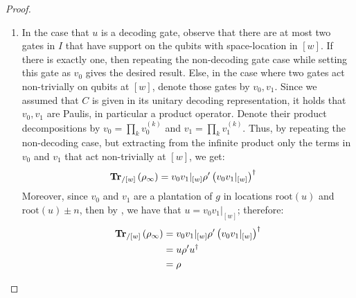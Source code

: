 \begin{proof}
\begin{enumerate}
\begin{enumerate}
 \begin{equation*}
   \begin{split}
   \Trr{}_{/[w]}\left( \rho_{\infty} \right) &= \Trr{}_{/[w]}\left( \prod_{j = -\infty}^{\infty} v_{j} \rho_{\infty}^{\prime} \prod_{j = -\infty}^{\infty} v_{j}^{\dagger} \right) \\ 
   &= v_{0}\Trr{}_{/[w]}\left( \prod_{j = -\infty, j \neq 0}^{\infty} v_{j} \rho_{\infty}^{\prime} \prod_{j = -\infty, j \neq 0}^{\infty} v_{j}^{\dagger} \right) v_{0}^{\dagger} \\
   &= v_{0}\Trr{}_{/[w]}\left( \prod_{j = -\infty, j \neq 0}^{\infty} v_{j}^{\dagger} \prod_{j = -\infty, j \neq 0}^{\infty} v_{j} \rho_{\infty}^{\prime} \right) v_{0}^{\dagger} \\
   &= v_{0}\Trr{}_{/[w]}\left( \rho_{\infty}^{\prime} \right) v_{0}^{\dagger} \\
   &= v_{0} \rho^{\prime} v_{0}^{\dagger} \\
   &= \rho 
   \end{split}
 \end{equation*}

 \item In the case that $u$ is a decoding gate, observe that there are at most two gates in $I$ that have support on the qubits with space-location in $[w]$. If there is exactly one, then repeating the non-decoding gate case while setting this gate as $v_{0}$ gives the desired result. 
Else, in the case where two gates act non-trivially on qubits at $[w]$, denote those gates by $v_{0}, v_{1}$. Since we assumed that $C$ is given in its unitary decoding representation, it holds that $v_{0}, v_{1}$ are Paulis, in particular a product operator. Denote their product decompositions by $v_{0} = \prod_{k}v_{0}^{(k)}$ and $v_{1} = \prod_{k}v_{1}^{(k)}$. Thus, by repeating the non-decoding case, but extracting from the infinite product only the terms in $v_{0}$ and $v_{1}$ that act non-trivially at $[w]$, we get:
   \begin{equation*}
     \begin{split}
       \mathbf{Tr}{}_{/[w]}\left( \rho_{\infty} \right) &= v_{0}v_{1}|_{[w]} \rho^{\prime} \left(v_{0}v_{1}|_{[w]}\right)^{\dagger} 
     \end{split}
   \end{equation*}
Moreover, since $v_{0}$ and $v_{1}$ are a plantation of $g$ in locations $\text{root}(u)$ and $\text{root}(u) \pm n$, then by , we have that $u = v_{0}v_{1}|_{[w]}$; therefore:
   \begin{equation*}
     \begin{split}
       \mathbf{Tr}{}_{/[w]}\left( \rho_{\infty} \right) &= v_{0}v_{1}|_{[w]} \rho^{\prime} \left(v_{0}v_{1}|_{[w]}\right)^{\dagger} \\
       &= u \rho^{\prime} u^{\dagger} \\
   &= \rho 
     \end{split}
   \end{equation*}
  \end{enumerate}
  \end{enumerate}
\end{proof}

